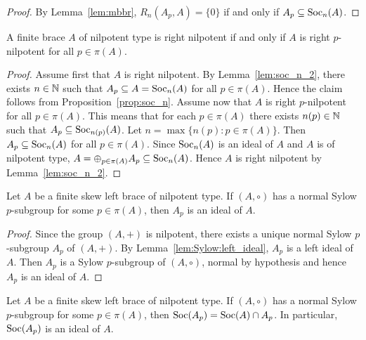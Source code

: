 \begin{proof}
    By Lemma~\ref{lem:mbbr}, %
    $R_n(A_p,A)=\{0\}$ if and only if $A_p\subseteq\operatorname{Soc}_n(A)$. 
\end{proof}


\begin{proposition}
    A finite brace $A$ of nilpotent type is right nilpotent if and only if $A$ is right $p$-nilpotent for all $p\in\pi(A)$. 
\end{proposition}

\begin{proof}
    Assume first that $A$ is right nilpotent. 
    By Lemma~\ref{lem:soc_n_2}, there exists $n\in\mathbb{N}$ such that $A_p\subseteq A=\operatorname{Soc}_n(A)$ for all $p\in\pi(A)$. Hence the claim follows from
    Proposition~\ref{prop:soc_n}. 
    Assume now
    that $A$ is right $p$-nilpotent for all $p\in\pi(A)$. This means
    that for each $p\in\pi(A)$ there exists $n(p)\in\mathbb{N}$ such that
    $A_p\subseteq\operatorname{Soc}_{n(p)}(A)$. Let 
    $n=\max\{n(p):p\in\pi(A)\}$. Then $A_p\subseteq\operatorname{Soc}_n(A)$ for all $p\in\pi(A)$. Since $\operatorname{Soc}_n(A)$ is an ideal
    of $A$ and $A$ is of nilpotent type, $A=\oplus_{p\in\pi(A)}A_p\subseteq\operatorname{Soc}_n(A)$. Hence $A$ is right nilpotent by Lemma~\ref{lem:soc_n_2}.
\end{proof}




\begin{lemma}
\label{lem:A_p:ideal}
    Let $A$ be a finite skew left brace of nilpotent type. If $(A,\circ)$ has a normal
    Sylow $p$-subgroup for some $p\in\pi(A)$, then $A_p$ is an ideal of $A$.
\end{lemma}

\begin{proof}
   Since the group $(A,+)$ is nilpotent, there exists a unique normal Sylow $p$-subgroup $A_p$ of $(A,+)$. 
   By Lemma~\ref{lem:Sylow:left_ideal}, $A_p$ is a left ideal of $A$. Then $A_p$ is a Sylow
   $p$-subgroup of $(A,\circ)$, normal by hypothesis and hence $A_p$ is an ideal of $A$. 
\end{proof}

\begin{lemma}
    \label{lem:Soc(A_p)}
    Let $A$ be a finite skew left brace of nilpotent type.
    If $(A,\circ)$ has a normal Sylow $p$-subgroup for some $p\in\pi(A)$, 
    then $\operatorname{Soc}(A_p)=\operatorname{Soc}(A)\cap A_p$. In particular, $\operatorname{Soc}(A_p)$ is an ideal of $A$.
\end{lemma}


